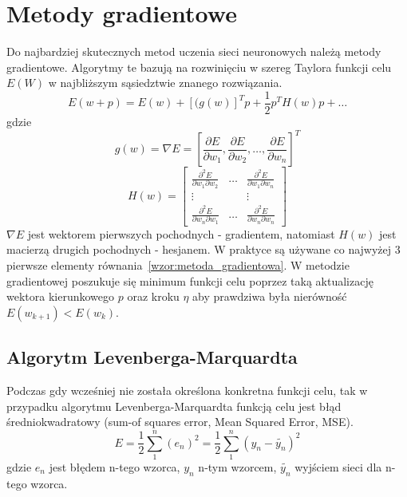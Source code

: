 \newpage
\section{Metody gradientowe}
Do najbardziej skutecznych metod uczenia sieci neuronowych należą metody gradientowe. Algorytmy te bazują na rozwinięciu w szereg Taylora funkcji celu $E(W)$ w najbliższym sąsiedztwie znanego rozwiązania\cite[str. 54]{Osowski}.
\begin{equation}
	\label{wzor:metoda_gradientowa}
	E(w + p) = E(w) + [(g(w)]^Tp + \frac{1}{2}p^TH(w)p + \hdots
\end{equation}
gdzie
$$g(w) = \nabla E = [\frac{\partial E}{\partial w_1}, \frac{\partial E}{\partial w_2}, \hdots, \frac{\partial E}{\partial w_n}]^T$$
$$H(w) = \begin{bmatrix}
\frac{\partial^2 E}{\partial w_1 \partial w_2} & \hdots & \frac{\partial^2 E}{\partial w_1 \partial w_n}\\
\vdots & & \vdots \\
\frac{\partial^2 E}{\partial w_n \partial w_1} & \hdots & \frac{\partial^2 E}{\partial w_n \partial w_n}
\end{bmatrix}$$
$\nabla E$ jest wektorem pierwszych pochodnych - gradientem, natomiast $H(w)$ jest macierzą drugich pochodnych - hesjanem. W praktyce są używane co najwyżej 3 pierwsze elementy równania~\ref{wzor:metoda_gradientowa}. W metodzie gradientowej poszukuje się minimum funkcji celu poprzez taką aktualizację wektora kierunkowego $p$ oraz kroku $\eta$ aby prawdziwa była nierówność $E(w_{k+1}) < E(w_k)$.

\subsection*{Algorytm Levenberga-Marquardta}
Podczas gdy wcześniej nie została określona konkretna funkcji celu, tak w przypadku algorytmu Levenberga-Marquardta funkcją celu jest błąd średniokwadratowy (sum-of squares error, Mean Squared Error, MSE)\cite[str. 290]{Bishop}.
\begin{equation}
	\label{wzor:mse}
	E = \frac{1}{2} \sum_1^n(e_n)^2 = \frac{1}{2} \sum_1^n(y_n - \tilde{y_n})^2
\end{equation}
gdzie $e_n$ jest błędem n-tego wzorca, $y_n$ n-tym wzorcem, $\tilde{y_n}$ wyjściem sieci dla n-tego wzorca.

